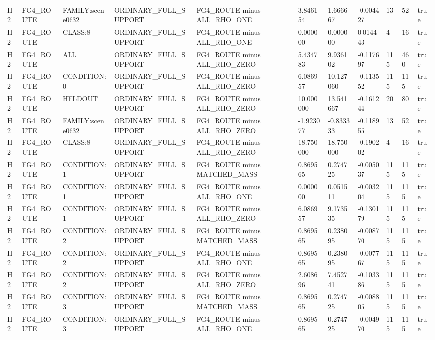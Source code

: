 \begin{tabular}{lllllllllll}
H2 & FG4\_ROUTE & FAMILY:scene0632 & ORDINARY\_FULL\_SUPPORT & FG4\_ROUTE minus ALL\_RHO\_ONE & 3.846154 & 1.666667 & -0.004427 & 13 & 52 & true \\
H2 & FG4\_ROUTE & CLASS:8 & ORDINARY\_FULL\_SUPPORT & FG4\_ROUTE minus ALL\_RHO\_ONE & 0.000000 & 0.000000 & 0.014443 & 4 & 16 & true \\
H2 & FG4\_ROUTE & ALL & ORDINARY\_FULL\_SUPPORT & FG4\_ROUTE minus ALL\_RHO\_ZERO & 5.434783 & 9.936102 & -0.117697 & 115 & 460 & true \\
H2 & FG4\_ROUTE & CONDITION:0 & ORDINARY\_FULL\_SUPPORT & FG4\_ROUTE minus ALL\_RHO\_ZERO & 6.086957 & 10.127060 & -0.113552 & 115 & 115 & true \\
H2 & FG4\_ROUTE & HELDOUT & ORDINARY\_FULL\_SUPPORT & FG4\_ROUTE minus ALL\_RHO\_ZERO & 10.000000 & 13.541667 & -0.161244 & 20 & 80 & true \\
H2 & FG4\_ROUTE & FAMILY:scene0632 & ORDINARY\_FULL\_SUPPORT & FG4\_ROUTE minus ALL\_RHO\_ZERO & -1.923077 & -0.833333 & -0.118955 & 13 & 52 & true \\
H2 & FG4\_ROUTE & CLASS:8 & ORDINARY\_FULL\_SUPPORT & FG4\_ROUTE minus ALL\_RHO\_ZERO & 18.750000 & 18.750000 & -0.190202 & 4 & 16 & true \\
H2 & FG4\_ROUTE & CONDITION:1 & ORDINARY\_FULL\_SUPPORT & FG4\_ROUTE minus MATCHED\_MASS & 0.869565 & 0.274725 & -0.005037 & 115 & 115 & true \\
H2 & FG4\_ROUTE & CONDITION:1 & ORDINARY\_FULL\_SUPPORT & FG4\_ROUTE minus ALL\_RHO\_ONE & 0.000000 & 0.051511 & -0.003204 & 115 & 115 & true \\
H2 & FG4\_ROUTE & CONDITION:1 & ORDINARY\_FULL\_SUPPORT & FG4\_ROUTE minus ALL\_RHO\_ZERO & 6.086957 & 9.173535 & -0.130179 & 115 & 115 & true \\
H2 & FG4\_ROUTE & CONDITION:2 & ORDINARY\_FULL\_SUPPORT & FG4\_ROUTE minus MATCHED\_MASS & 0.869565 & 0.238095 & -0.008770 & 115 & 115 & true \\
H2 & FG4\_ROUTE & CONDITION:2 & ORDINARY\_FULL\_SUPPORT & FG4\_ROUTE minus ALL\_RHO\_ONE & 0.869565 & 0.238095 & -0.007767 & 115 & 115 & true \\
H2 & FG4\_ROUTE & CONDITION:2 & ORDINARY\_FULL\_SUPPORT & FG4\_ROUTE minus ALL\_RHO\_ZERO & 2.608696 & 7.452741 & -0.103386 & 115 & 115 & true \\
H2 & FG4\_ROUTE & CONDITION:3 & ORDINARY\_FULL\_SUPPORT & FG4\_ROUTE minus MATCHED\_MASS & 0.869565 & 0.274725 & -0.008805 & 115 & 115 & true \\
H2 & FG4\_ROUTE & CONDITION:3 & ORDINARY\_FULL\_SUPPORT & FG4\_ROUTE minus ALL\_RHO\_ONE & 0.869565 & 0.274725 & -0.004970 & 115 & 115 & true \\

\end{tabular}
